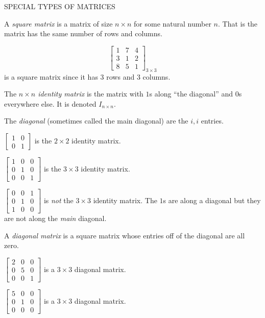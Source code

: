 SPECIAL TYPES OF MATRICES

A \emph{square matrix} is a matrix of size \(n \times n\) for some natural number \(n.\) That is the matrix has the same number of rows and columns.

\begin{example}
    \[\begin{bmatrix}
        1 & 7 & 4 \\
        3 & 1 & 2 \\
        8 & 5 & 1
    \end{bmatrix}_{3\times 3}\]
    is a square matrix since it has \(3\) rows and \(3\) columns.
\end{example}

The \emph{\(n \times n\) identity matrix} is the matrix with \(1\)s along ``the diagonal'' and \(0\)s everywhere else. It is denoted \(I_{n \times n}.\)

The \emph{diagonal} (sometimes called the main diagonal) are the \(i,i\) entries.

\begin{example}
    \(\begin{bmatrix}
        1 & 0 \\
        0 & 1
    \end{bmatrix}\) is the \(2\times 2\) identity matrix.

    \(\begin{bmatrix}
        1 & 0 & 0\\
        0 & 1 & 0\\
        0 & 0 & 1
    \end{bmatrix}\) is the \(3\times 3\) identity matrix.

        \(\begin{bmatrix}
        0 & 0 & 1\\
        0 & 1 & 0\\
        1 & 0 & 0
    \end{bmatrix}\) is \emph{not} the \(3\times 3\) identity matrix. The \(1\)s are along a diagonal but they are not along the \emph{main} diagonal.
\end{example}

A \emph{diagonal matrix} is a square matrix whose entries off of the diagonal are all zero.

\begin{example}
    \(\begin{bmatrix}
        2 & 0 & 0 \\
        0 & 5 & 0 \\
        0 & 0 & 1
    \end{bmatrix}\) is a \(3 \times 3\) diagonal matrix.

    \(\begin{bmatrix}
        5 & 0 & 0\\
        0 & 1 & 0 \\
        0 & 0 & 0
    \end{bmatrix}\) is a \(3 \times 3\) diagonal matrix.
\end{example}